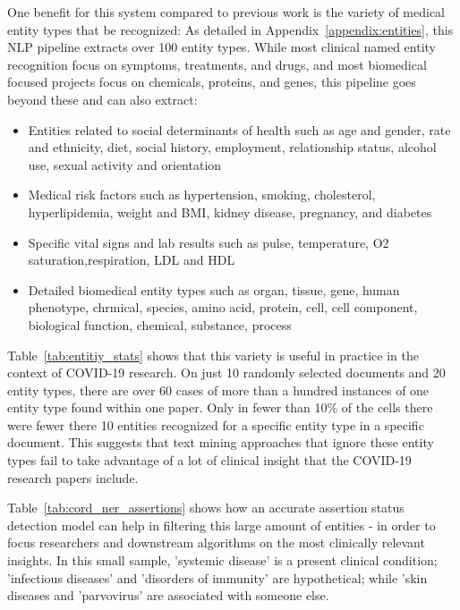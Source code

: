 \documentclass[letterpaper]{article} \usepackage{aaai21}  \usepackage{times}  \usepackage{helvet} \usepackage{courier}  \usepackage[hyphens]{url}  \usepackage{graphicx} \urlstyle{rm} \def\UrlFont{\rm}  \usepackage{natbib}  \usepackage{caption} \frenchspacing  \setlength{\pdfpagewidth}{8.5in}  \setlength{\pdfpageheight}{11in}  \usepackage{lscape}
\begin{document}
One benefit for this system compared to previous work is the variety of medical entity types that be recognized: As detailed in Appendix~\ref{appendix:entities}, this NLP pipeline extracts over 100 entity types. While most clinical named entity recognition focus on symptoms, treatments, and drugs, and most biomedical focused projects focus on chemicals, proteins, and genes, this pipeline goes beyond these and can also extract:

\begin{itemize}

\item Entities related to social determinants of health such as age and gender, rate and ethnicity, diet, social history, employment, relationship status, alcohol use, sexual activity and orientation

\item Medical risk factors such as hypertension, smoking, cholesterol, hyperlipidemia, weight and BMI, kidney disease, pregnancy, and diabetes

\item Specific vital signs and lab results such as pulse, temperature, O2 saturation,respiration, LDL and HDL

\item Detailed biomedical entity types such as organ, tissue, gene, human phenotype, chrmical, species, amino acid, protein, cell, cell component, biological function, chemical, substance, process

\end{itemize}

Table~\ref{tab:entitiy_stats} shows that this variety is useful in practice in the context of COVID-19 research. On just 10 randomly selected documents and 20 entity types, there are over 60 cases of more than a hundred instances of one entity type found within one paper. Only in fewer than 10\% of the cells there were fewer there 10 entities recognized for a specific entity type in a specific document. This suggests that text mining approaches that ignore these entity types fail to take advantage of a lot of clinical insight that the COVID-19 research papers include.

Table~\ref{tab:cord_ner_assertions} shows how an accurate assertion status detection model can help in filtering this large amount of entities - in order to focus researchers and downstream algorithms on the most clinically relevant insights. In this small sample, 'systemic disease' is a present clinical condition; 'infectious diseases' and 'disorders of immunity' are hypothetical; while 'skin diseases and 'parvovirus' are associated with someone else.
\end{document}
